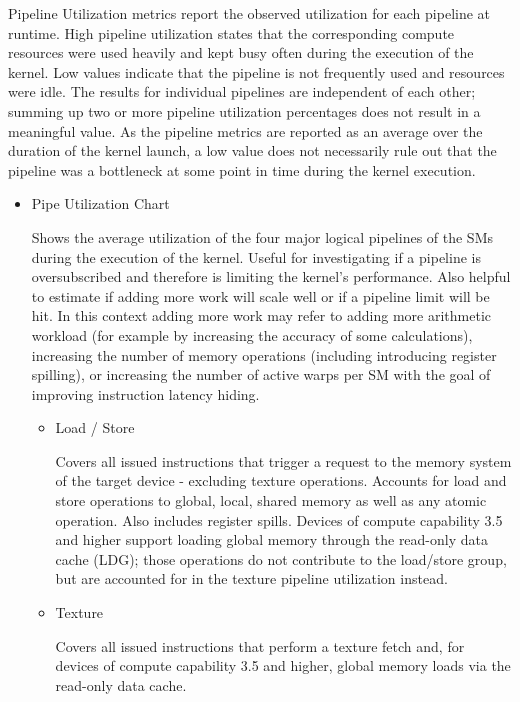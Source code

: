 \documentclass[oneside,openright,12pt,final,en]{mgr}
\begin{document}
Pipeline Utilization metrics report the observed utilization for each pipeline at runtime. High pipeline utilization states that the corresponding compute resources were used heavily and kept busy often during the execution of the kernel. Low values indicate that the pipeline is not frequently used and resources were idle. The results for individual pipelines are independent of each other; summing up two or more pipeline utilization percentages does not result in a meaningful value. As the pipeline metrics are reported as an average over the duration of the kernel launch, a low value does not necessarily rule out that the pipeline was a bottleneck at some point in time during the kernel execution.

\begin{itemize}
	\item Pipe Utilization Chart
	
	Shows the average utilization of the four major logical pipelines of the SMs during the execution of the kernel. Useful for investigating if a pipeline is oversubscribed and therefore is limiting the kernel's performance. Also helpful to estimate if adding more work will scale well or if a pipeline limit will be hit. In this context adding more work may refer to adding more arithmetic workload (for example by increasing the accuracy of some calculations), increasing the number of memory operations (including introducing register spilling), or increasing the number of active warps per SM with the goal of improving instruction latency hiding.
	
	
	\begin{itemize}
		\item Load / Store  
		
		Covers all issued instructions that trigger a request to the memory system of the target device - excluding texture operations. Accounts for load and store operations to global, local, shared memory as well as any atomic operation. Also includes register spills. Devices of compute capability 3.5 and higher support loading global memory through the read-only data cache (LDG); those operations do not contribute to the load/store group, but are accounted for in the texture pipeline utilization instead. 
		
		\item Texture 
		
		Covers all issued instructions that perform a texture fetch and, for devices of compute capability 3.5 and higher, global memory loads via the  read-only data cache.
		

\end{itemize}
\end{itemize}
\end{document}
